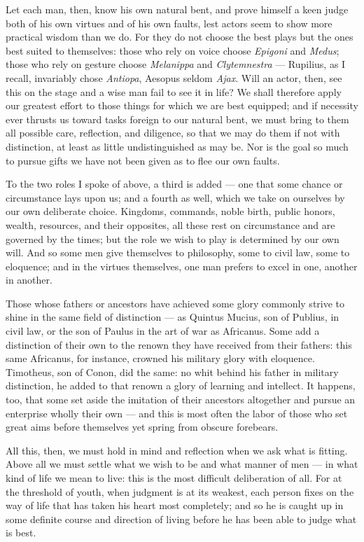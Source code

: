  Let each man, then, know his own natural bent, and prove himself a keen judge both of his own virtues and of his own faults, lest actors seem to show more practical wisdom than we do. For they do not choose the best plays but the ones best suited to themselves: those who rely on voice choose \textit{Epigoni} and \textit{Medus}; those who rely on gesture choose \textit{Melanippa} and \textit{Clytemnestra} — Rupilius, as I recall, invariably chose \textit{Antiopa}, Aesopus seldom \textit{Ajax}. Will an actor, then, see this on the stage and a wise man fail to see it in life? We shall therefore apply our greatest effort to those things for which we are best equipped; and if necessity ever thrusts us toward tasks foreign to our natural bent, we must bring to them all possible care, reflection, and diligence, so that we may do them if not with distinction, at least as little undistinguished as may be. Nor is the goal so much to pursue gifts we have not been given as to flee our own faults.

 To the two roles I spoke of above, a third is added — one that some chance or circumstance lays upon us; and a fourth as well, which we take on ourselves by our own deliberate choice. Kingdoms, commands, noble birth, public honors, wealth, resources, and their opposites, all these rest on circumstance and are governed by the times; but the role we wish to play is determined by our own will. And so some men give themselves to philosophy, some to civil law, some to eloquence; and in the virtues themselves, one man prefers to excel in one, another in another.

 Those whose fathers or ancestors have achieved some glory commonly strive to shine in the same field of distinction — as Quintus Mucius, son of Publius, in civil law, or the son of Paulus in the art of war as Africanus. Some add a distinction of their own to the renown they have received from their fathers: this same Africanus, for instance, crowned his military glory with eloquence. Timotheus, son of Conon, did the same: no whit behind his father in military distinction, he added to that renown a glory of learning and intellect. It happens, too, that some set aside the imitation of their ancestors altogether and pursue an enterprise wholly their own — and this is most often the labor of those who set great aims before themselves yet spring from obscure forebears.

 All this, then, we must hold in mind and reflection when we ask what is fitting. Above all we must settle what we wish to be and what manner of men — in what kind of life we mean to live: this is the most difficult deliberation of all. For at the threshold of youth, when judgment is at its weakest, each person fixes on the way of life that has taken his heart most completely; and so he is caught up in some definite course and direction of living before he has been able to judge what is best.

